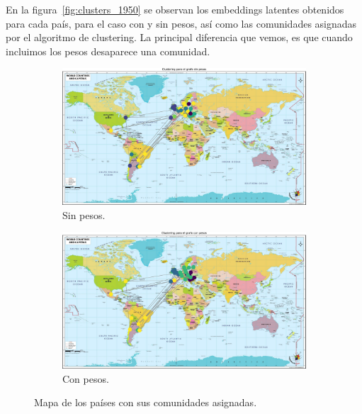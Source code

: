 \documentclass{article}
\begin{document}
En la figura~\ref{fig:clusters_1950} se observan los embeddings latentes obtenidos para cada país, para el caso con y sin pesos, así como las comunidades asignadas por el algoritmo de clustering. La principal diferencia que vemos, es que cuando incluimos los pesos desaparece
una comunidad.

\begin{figure}[htb]
    \centering
    \begin{subfigure}{0.49\textwidth}
        \centering
        \includegraphics[width=\linewidth]{images/mapas/mapa_sin_pesos_1950.pdf}
        \caption{Sin pesos.}
        \label{fig:1950_sin_pesos}
    \end{subfigure}
    \begin{subfigure}{0.49\textwidth}
        \centering
        \includegraphics[width=\linewidth]{images/mapas/mapa_con_pesos_1950.pdf}
        \caption{Con pesos.}
        \label{fig:1950_con_pesos}
    \end{subfigure}
    \caption{Mapa de los países con sus comunidades asignadas.}
    \label{fig:mapa_1950}
\end{figure}
\end{document}
